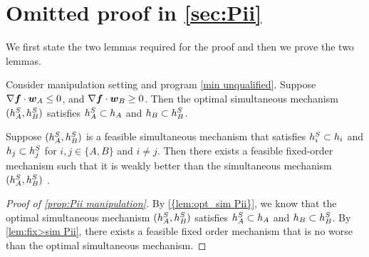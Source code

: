 \section{Omitted proof in \cref{sec:Pii}}\label{appendix: alternative objective}

We first state the two lemmas required for the proof and then we prove the two lemmas.
\begin{lemma}\label{lem:opt_sim Pii}
Consider manipulation setting and program \ref{min unqualified}.
     Suppose $\nabla \boldsymbol{f} \cdot \boldsymbol{w}_A \leq 0$, and $\nabla \boldsymbol{f} \cdot \boldsymbol{w}_B \geq 0$.
    Then the optimal simultaneous mechanism $(h_A^S,h_B^S)$ satisfies  $h_A^S\subset h_A$ and $h_B\subset h_B^S$.
\end{lemma}


\begin{lemma}\label{lem:fix>sim Pii}

    Suppose $(h_A^S,h_B^S)$ is a feasible simultaneous mechanism that satisfies $h_i^S\subset h_i$ and $h_j\subset h_j^S$ for $i,j\in \{A,B\}$ and $i\neq j$.
    Then there exists a feasible fixed-order mechanism such that it is weakly better than the simultaneous mechanism $(h_A^S,h_B^S)$ .
\end{lemma}



\begin{proof}[Proof of \cref{prop:Pii manipulation}]
    By \cref{{lem:opt_sim Pii}}, we know that the optimal simultaneous mechanism $(h_A^S,h_B^S)$ satisfies  $h_A^S\subset h_A$ and $h_B\subset h_B^S$.
    By \cref{lem:fix>sim Pii}, there exists a feasible fixed order mechanism that is no worse than the optimal simultaneous mechanism. 
\end{proof}

